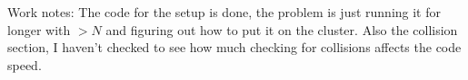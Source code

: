 Work notes: The code for the setup is done, the problem is just running it for longer with $>N$ and figuring out how to put it on the cluster. Also the collision section, I haven't checked to see how much checking for collisions affects the code speed.

	 
